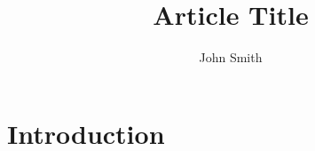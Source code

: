 \documentclass{article}
\title{Article Title}
\author{John Smith}
\begin{document}
\maketitle

\section{Introduction}
\blindtext
\end{document}
